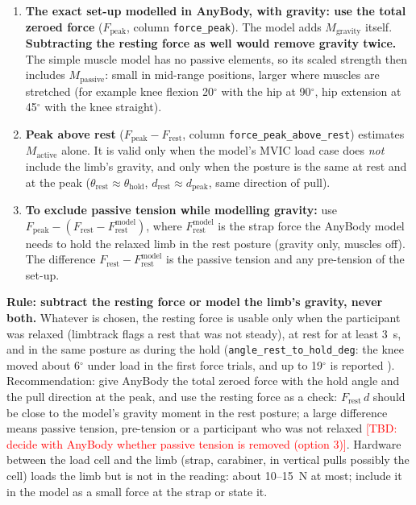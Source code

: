 \documentclass[a4paper,10pt]{article}
\newcommand{\lt}{\textsf{limbtrack}}
\newcommand{\code}[1]{\texttt{#1}}
\newcommand{\dg}{\ensuremath{^\circ}}
\newcommand{\tbd}[1]{\textcolor{red}{[TBD: #1]}}
\begin{document}
\begin{enumerate}
\item \textbf{The exact set-up modelled in AnyBody, with gravity: use the total zeroed force} ($F_\text{peak}$, column \code{force\_peak}).
  The model adds $M_\text{gravity}$ itself. \textbf{Subtracting the resting force as well would remove gravity twice.} The simple muscle
  model has no passive elements, so its scaled strength then includes $M_\text{passive}$: small in mid-range positions, larger where muscles
  are stretched (for example knee flexion 20\dg{} with the hip at 90\dg, hip extension at 45\dg{} with the knee straight).
\item \textbf{Peak above rest} ($F_\text{peak}-F_\text{rest}$, column \code{force\_peak\_above\_rest}) estimates $M_\text{active}$ alone.
  It is valid only when the model's MVIC load case does \emph{not} include the limb's gravity, and only when the posture is the same at rest
  and at the peak ($\theta_\text{rest}\approx\theta_\text{hold}$, $d_\text{rest}\approx d_\text{peak}$, same direction of pull).
\item \textbf{To exclude passive tension while modelling gravity:} use $F_\text{peak} - (F_\text{rest} - F_\text{rest}^\text{model})$,
  where $F_\text{rest}^\text{model}$ is the strap force the AnyBody model needs to hold the relaxed limb in the rest posture (gravity only,
  muscles off). The difference $F_\text{rest} - F_\text{rest}^\text{model}$ is the passive tension and any pre-tension of the set-up.
\end{enumerate}

\noindent\textbf{Rule: subtract the resting force or model the limb's gravity, never both.} Whatever is chosen, the resting force is
usable only when the participant was relaxed (\lt{} flags a rest that was not steady), at rest for at least 3~s, and in the same posture as
during the hold (\code{angle\_rest\_to\_hold\_deg}: the knee moved about 6\dg{} under load in the first force trials, and up to 19\dg{} is
reported \cite{tsaopoulos}). Recommendation: give AnyBody the total zeroed force with the hold angle and the pull direction at the peak,
and use the resting force as a check: $F_\text{rest}\,d$ should be close to the model's gravity moment in the rest posture; a large
difference means passive tension, pre-tension or a participant who was not relaxed \tbd{decide with AnyBody whether passive tension is
removed (option 3)}. Hardware between the load cell and the limb (strap, carabiner, in vertical pulls possibly the cell) loads the limb but
is not in the reading: about 10--15~N at most; include it in the model as a small force at the strap or state it.
\end{document}
